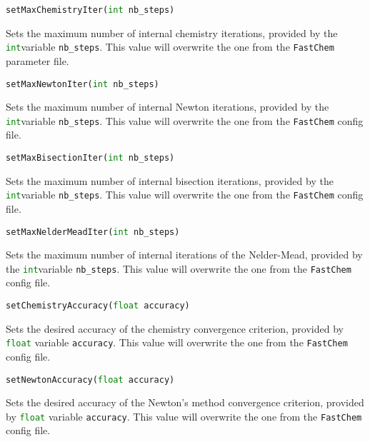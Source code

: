 \documentclass[numbers=noenddot]{fcmanual}
\newcommand{\fc}{\texttt{FastChem}\xspace}
\begin{document}
\bigbreak

\lstinline[language=Python]!setMaxChemistryIter(int nb_steps)!
\begin{addmargin}[25pt]{0pt}
	Sets the maximum number of internal chemistry iterations, provided by the \lstinline[language=Python]!int!\footnotemark[\value{footnote}] variable \lstinline!nb_steps!. This value will overwrite the one from the \fc parameter file.
\end{addmargin}

\bigbreak

\lstinline[language=Python]!setMaxNewtonIter(int nb_steps)!
\begin{addmargin}[25pt]{0pt}
	Sets the maximum number of internal Newton iterations, provided by the \lstinline[language=Python]!int!\footnotemark[\value{footnote}] variable \lstinline!nb_steps!. This value will overwrite the one from the \fc config file.
\end{addmargin}

\bigbreak

\lstinline[language=Python]!setMaxBisectionIter(int nb_steps)!
\begin{addmargin}[25pt]{0pt}
	Sets the maximum number of internal bisection iterations, provided by the \lstinline[language=Python]!int!\footnotemark[\value{footnote}] variable \lstinline!nb_steps!. This value will overwrite the one from the \fc config file.
\end{addmargin}

\bigbreak

\lstinline[language=Python]!setMaxNelderMeadIter(int nb_steps)!
\begin{addmargin}[25pt]{0pt}
	Sets the maximum number of internal iterations of the Nelder-Mead, provided by the \lstinline[language=Python]!int!\footnotemark[\value{footnote}] variable \lstinline!nb_steps!. This value will overwrite the one from the \fc config file.
\end{addmargin}

\bigbreak

\lstinline[language=Python]!setChemistryAccuracy(float accuracy)!
\begin{addmargin}[25pt]{0pt}
	Sets the desired accuracy of the chemistry convergence criterion, provided by \lstinline[language=Python]!float! variable \lstinline!accuracy!. This value will overwrite the one from the \fc config file.
\end{addmargin}

\bigbreak

\lstinline[language=Python]!setNewtonAccuracy(float accuracy)!
\begin{addmargin}[25pt]{0pt}
	Sets the desired accuracy of the Newton's method convergence criterion, provided by \lstinline[language=Python]!float! variable \lstinline!accuracy!. This value will overwrite the one from the \fc config file.
\end{addmargin}
\end{document}

